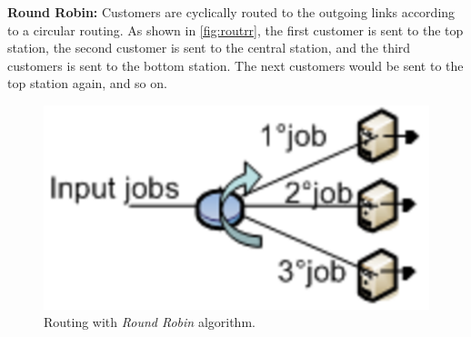 \begin{itemize*}
\item \textbf{Round Robin:} Customers are cyclically routed to the
outgoing links according to a circular routing. As shown in
\autoref{fig:routrr}, the first customer is sent to the top
station, the second customer is sent to the central station, and
the third customers is sent to the bottom station. The next
customers would be sent to the top station again, and so on.
\begin{figure}[htb]
    \begin{center}
        \includegraphics[scale=.5]{img/jsimg/8.8.eps}
    \end{center}
    \caption{Routing with \emph{Round Robin} algorithm.}
    \label{fig:routrr}
\end{figure}


\end{itemize*}
